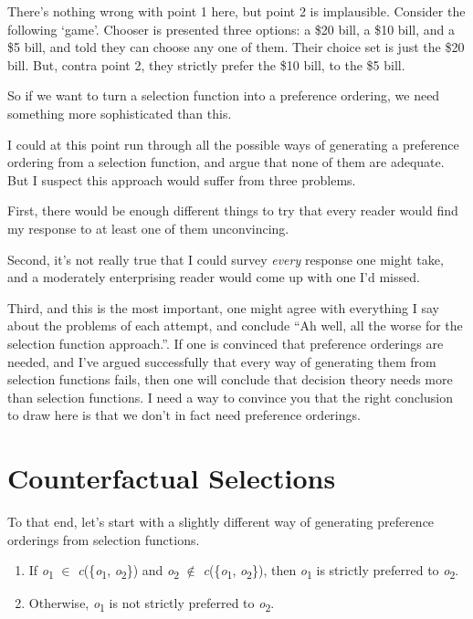 \documentclass[
  12pt,
  letterpaper,
  DIV=11,
  numbers=noendperiod]{scrreprt}
\providecommand{\tightlist}{%
  \setlength{\itemsep}{0pt}\setlength{\parskip}{0pt}}\usepackage{longtable,booktabs,array}
\begin{document}
There's nothing wrong with point 1 here, but point 2 is implausible.
Consider the following `game'. Chooser is presented three options: a
\$20 bill, a \$10 bill, and a \$5 bill, and told they can choose any one
of them. Their choice set is just the \$20 bill. But, contra point 2,
they strictly prefer the \$10 bill, to the \$5 bill.

So if we want to turn a selection function into a preference ordering,
we need something more sophisticated than this.

I could at this point run through all the possible ways of generating a
preference ordering from a selection function, and argue that none of
them are adequate. But I suspect this approach would suffer from three
problems.

First, there would be enough different things to try that every reader
would find my response to at least one of them unconvincing.

Second, it's not really true that I could survey \emph{every} response
one might take, and a moderately enterprising reader would come up with
one I'd missed.

Third, and this is the most important, one might agree with everything I
say about the problems of each attempt, and conclude ``Ah well, all the
worse for the selection function approach.''. If one is convinced that
preference orderings are needed, and I've argued successfully that every
way of generating them from selection functions fails, then one will
conclude that decision theory needs more than selection functions. I
need a way to convince you that the right conclusion to draw here is
that we don't in fact need preference orderings.

\section{Counterfactual Selections}\label{sec-counterfactual-selections}

To that end, let's start with a slightly different way of generating
preference orderings from selection functions.

\begin{enumerate}
\def\labelenumi{\arabic{enumi}.}
\tightlist
\item
  If \emph{o}\textsubscript{1} \(\in\)
  \emph{c}(\{\emph{o}\textsubscript{1}, \emph{o}\textsubscript{2}\}) and
  \emph{o}\textsubscript{2} \(\notin\)
  \emph{c}(\{\emph{o}\textsubscript{1}, \emph{o}\textsubscript{2}\}),
  then \emph{o}\textsubscript{1} is strictly preferred to
  \emph{o}\textsubscript{2}.
\item
  Otherwise, \emph{o}\textsubscript{1} is not strictly preferred to
  \emph{o}\textsubscript{2}.
\end{enumerate}
\end{document}

